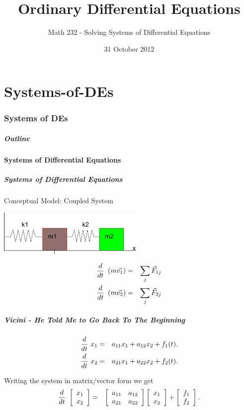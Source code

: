 \part{Systems-of-DEs}
\section{Systems of DEs}


\title{Ordinary Differential Equations}
\subtitle{Math 232 - Solving Systems of Differential Equations}
\date{31 October 2012}

\begin{frame}
  \titlepage
\end{frame}

\begin{frame}
  \frametitle{Outline}
\end{frame}


\subsection{Systems of Differential Equations}


\begin{frame}
  \frametitle{Systems of Differential Equations}

  Conceptual Model: Coupled System \\
  \centerline{\includegraphics[width=7cm]{img/doubleSpringMass}}

  \begin{eqnarray*}
    \deriv{~}{t} \lp m \vec{v_1} \rp & = & \sum_j \vec{F}_{1j} \\
    \deriv{~}{t} \lp m \vec{v_2} \rp & = & \sum_j \vec{F}_{2j} 
  \end{eqnarray*}


\end{frame}


\begin{frame}
  \frametitle{Vicini - He Told Me to Go Back To The Beginning}

  \begin{eqnarray*}
    \deriv{~}{t} x_1  & = & a_{11} x_1 + a_{12} x_2 + f_1(t), \\
    \deriv{~}{t} x_2  & = & a_{21} x_1 + a_{22} x_2 + f_2(t).
  \end{eqnarray*}

  Writing the system in matrix/vector form we get
  \begin{eqnarray*}
    \deriv{~}{t} \vecTwo{x_1}{x_2} & = & 
    \arrayTwo{a_{11}}{a_{12}}{a_{21}}{a_{22}} \vecTwo{x_1}{x_2} + 
    \vecTwo{f_1}{f_2}.
  \end{eqnarray*}

\end{frame}


